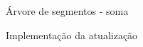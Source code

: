 \begin{frame}{Árvore de segmentos - soma}

    \begin{block}{Implementação da atualização}
        \footnotesize
        \inputminted{cpp}{codigos/atualizacao.cpp}    
    \end{block}

\end{frame}
